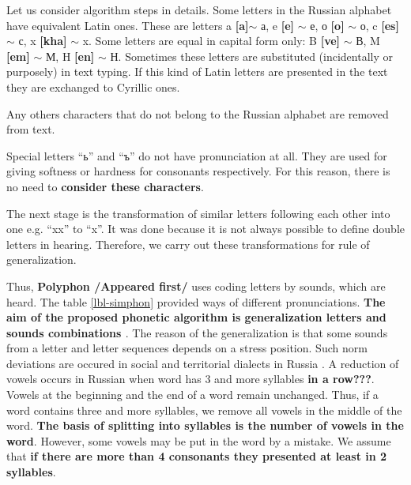 \documentclass{svproc}
\begin{document}
Let us consider algorithm steps in details. Some letters in the Russian alphabet have equivalent Latin ones. These are letters a \textbf{[a]}$\sim$ а, e \textbf{[e]} $\sim$ е, о \textbf{[o]} $\sim$ о, c \textbf{[es]} $\sim$ с, x \textbf{[kha]} $\sim$ x. Some letters are equal in capital form only: B \textbf{[ve]} $\sim$ В, M \textbf{[em]} $\sim$ М, H \textbf{[en]} $\sim$ Н. Sometimes these letters are substituted (incidentally or purposely) in text typing. If this kind of Latin letters are presented in the text they are exchanged to Cyrillic ones.

Any others characters that do not belong to the Russian alphabet are removed from text.

Special letters “ь” and “ъ” do not have pronunciation at all. They are used for giving softness or hardness for consonants respectively. For this reason, there is no need to \textbf{consider these characters}.

The next stage is the transformation of similar letters following each other into one e.g. “xx” to “x”. It was done because it is not always possible to define double letters in hearing. Therefore, we carry out these transformations for rule of generalization.

Thus, \textbf{Polyphon /Appeared first/} uses coding letters by sounds, which are heard.  The table \ref{lbl-simphon} provided ways of different pronunciations. \textbf{The aim of the proposed phonetic algorithm is generalization letters and sounds combinations \cite{Ivanova-2005}}. The reason of the generalization is that some sounds from a letter and letter sequences depends on a stress position.  Such norm deviations are occured in social and territorial dialects in Russia \cite{Zhirmunsky-1936}. A reduction of vowels occurs in Russian when word has 3 and more syllables \textbf{in a row???}. Vowels at the beginning and the end of a word remain unchanged. Thus, if a word contains three and more syllables, we remove all vowels in the middle of the word. \textbf{The basis of splitting into syllables is the number of vowels in the word}. However, some vowels may be put in the word by a mistake. We assume that \textbf{if there are more than 4 consonants they presented at least in 2 syllables}.
\end{document}
